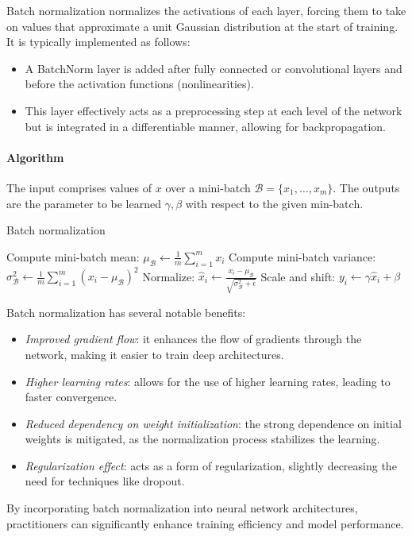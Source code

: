 Batch normalization normalizes the activations of each layer, forcing them to take on values that approximate a unit Gaussian distribution at the start of training. 
It is typically implemented as follows:
\begin{itemize}
    \item A BatchNorm layer is added after fully connected or convolutional layers and before the activation functions (nonlinearities).
    \item This layer effectively acts as a preprocessing step at each level of the network but is integrated in a differentiable manner, allowing for backpropagation.
\end{itemize}

\paragraph*{Algorithm}
The input comprises values of $x$ over a mini-batch $\mathcal{B} = \{ x_1, \dots, x_m \}$. 
The outputs are the parameter to be learned $\gamma, \beta$ with respect to the given min-batch.
\begin{algorithm}
    \caption{Batch normalization}
    \begin{algorithmic}[1]
        \State Compute mini-batch mean: $\mu_{\mathcal{B}} \gets \frac{1}{m} \sum_{i=1}^m x_i$
        \State Compute mini-batch variance: $\sigma_{\mathcal{B}}^2 \gets \frac{1}{m} \sum_{i=1}^m (x_i - \mu_{\mathcal{B}})^2$
        \State Normalize: $\hat{x}_i \gets \frac{x_i - \mu_{\mathcal{B}}}{\sqrt{\sigma_{\mathcal{B}}^2 + \epsilon}}$     
        \State Scale and shift: $y_i \gets \gamma \hat{x}_i + \beta$
    \end{algorithmic}
\end{algorithm}
Batch normalization has several notable benefits:
\begin{itemize}
    \item \textit{Improved gradient flow}: it enhances the flow of gradients through the network, making it easier to train deep architectures.
    \item \textit{Higher learning rates}: allows for the use of higher learning rates, leading to faster convergence.
    \item \textit{Reduced dependency on weight initialization}: the strong dependence on initial weights is mitigated, as the normalization process stabilizes the learning.
    \item \textit{Regularization effect}: acts as a form of regularization, slightly decreasing the need for techniques like dropout.
\end{itemize}
By incorporating batch normalization into neural network architectures, practitioners can significantly enhance training efficiency and model performance.

